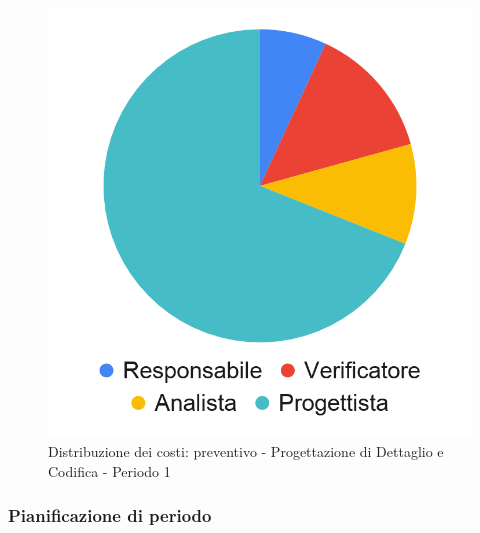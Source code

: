 \hspace{-1cm}
\begin{minipage}{.50\textwidth}
\smallPreventivoTable{
	
}
\end{minipage}
\hspace{1cm}
\begin{minipage}{.40\textwidth}
\begin{figure}[H]
	\includegraphics[scale=0.21]{res/images/charts/preventivo_priori/Grafico4-6.png}
	\caption{Distribuzione dei costi: preventivo - Progettazione di Dettaglio e Codifica - Periodo 1}
\end{figure}
\end{minipage} 



\subsubsection{Pianificazione di periodo}


